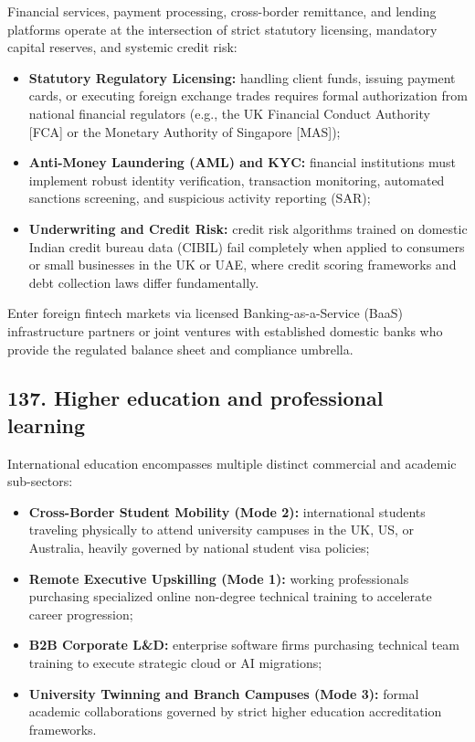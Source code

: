 Financial services, payment processing, cross-border remittance, and lending platforms operate at the intersection of strict statutory licensing, mandatory capital reserves, and systemic credit risk:
\begin{itemize}
    \item \textbf{Statutory Regulatory Licensing:} handling client funds, issuing payment cards, or executing foreign exchange trades requires formal authorization from national financial regulators (e.g., the UK Financial Conduct Authority [FCA] or the Monetary Authority of Singapore [MAS]);
    \item \textbf{Anti-Money Laundering (AML) and KYC:} financial institutions must implement robust identity verification, transaction monitoring, automated sanctions screening, and suspicious activity reporting (SAR);
    \item \textbf{Underwriting and Credit Risk:} credit risk algorithms trained on domestic Indian credit bureau data (CIBIL) fail completely when applied to consumers or small businesses in the UK or UAE, where credit scoring frameworks and debt collection laws differ fundamentally.
\end{itemize}
Enter foreign fintech markets via licensed Banking-as-a-Service (BaaS) infrastructure partners or joint ventures with established domestic banks who provide the regulated balance sheet and compliance umbrella.

\subsection{137. Higher education and professional learning}

International education encompasses multiple distinct commercial and academic sub-sectors:
\begin{itemize}
    \item \textbf{Cross-Border Student Mobility (Mode 2):} international students traveling physically to attend university campuses in the UK, US, or Australia, heavily governed by national student visa policies;
    \item \textbf{Remote Executive Upskilling (Mode 1):} working professionals purchasing specialized online non-degree technical training to accelerate career progression;
    \item \textbf{B2B Corporate L\&D:} enterprise software firms purchasing technical team training to execute strategic cloud or AI migrations;
    \item \textbf{University Twinning and Branch Campuses (Mode 3):} formal academic collaborations governed by strict higher education accreditation frameworks.
\end{itemize}

